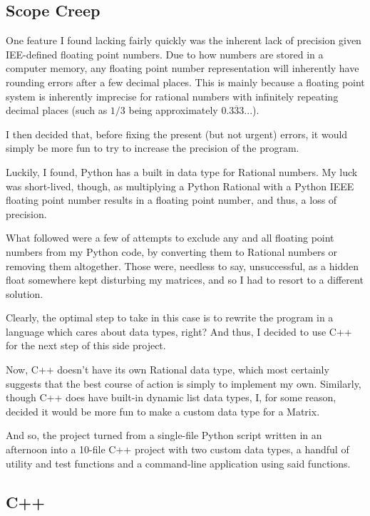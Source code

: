 \documentclass[11pt, a4paper]{article}
\begin{document}

\subsection{Scope Creep}

One feature I found lacking fairly quickly was the inherent lack of precision given IEE-defined floating point numbers.
Due to how numbers are stored in a computer memory, any floating point number representation will inherently have rounding errors after a few decimal places.
This is mainly because a floating point system is inherently imprecise for rational numbers with infinitely repeating decimal places (such as $1/3$ being approximately $0.\overline{333}...$).

I then decided that, before fixing the present (but not urgent) errors, it would simply be more fun to try to increase the precision of the program.

Luckily, I found, Python has a built in data type for Rational numbers.
My luck was short-lived, though, as multiplying a Python Rational with a Python IEEE floating point number results in a floating point number, and thus, a loss of precision.

What followed were a few of attempts to exclude any and all floating point numbers from my Python code, by converting them to Rational numbers or removing them altogether.
Those were, needless to say, unsuccessful, as a hidden float somewhere kept disturbing my matrices, and so I had to resort to a different solution.

Clearly, the optimal step to take in this case is to rewrite the program in a language which cares about data types, right?
And thus, I decided to use C++ for the next step of this side project.

Now, C++ doesn't have its own Rational data type, which most certainly suggests that the best course of action is simply to implement my own.
Similarly, though C++ does have built-in dynamic list data types, I, for some reason, decided it would be more fun to make a custom data type for a Matrix.

And so, the project turned from a single-file Python script written in an afternoon into a 10-file C++ project with two custom data types, a handful of utility and test functions and a command-line application using said functions.


\subsection{C++}
\end{document}
